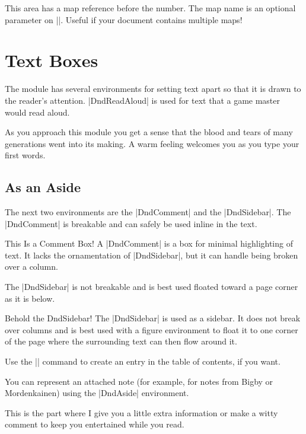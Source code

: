 \documentclass[letterpaper,twocolumn,openany,nodeprecatedcode]{dndbook}
\begin{document}
This area has a map reference before the number. The map name is an optional parameter on |\DndArea|. Useful if your document contains multiple maps!

\chapter{Text Boxes}

The module has several environments for setting text apart so that it is drawn to the reader's attention. |DndReadAloud| is used for text that a game master would read aloud.

\begin{DndReadAloud}
  As you approach this module you get a sense that the blood and tears of many generations went into its making. A warm feeling welcomes you as you type your first words.
\end{DndReadAloud}

\section{As an Aside}
The next two environments are the |DndComment| and the |DndSidebar|. The |DndComment| is breakable and can safely be used inline in the text.

\begin{DndComment}{This Is a Comment Box!}
  A |DndComment| is a box for minimal highlighting of text. It lacks the ornamentation of |DndSidebar|, but it can handle being broken over a column.
\end{DndComment}

The |DndSidebar| is not breakable and is best used floated toward a page corner as it is below.

\begin{DndSidebar}[float=!b]{Behold the DndSidebar!}
  The |DndSidebar| is used as a sidebar. It does not break over columns and is best used with a figure environment to float it to one corner of the page where the surrounding text can then flow around it.
  
  Use the || command to create an entry in the table of contents, if you want.
\end{DndSidebar}

You can represent an attached note (for example, for notes from Bigby or Mordenkainen) using the |DndAside| environment.

\begin{DndAside}
  This is the part where I give you a little extra information or make a witty comment to keep you entertained while you read.
\end{DndAside}
\end{document}
